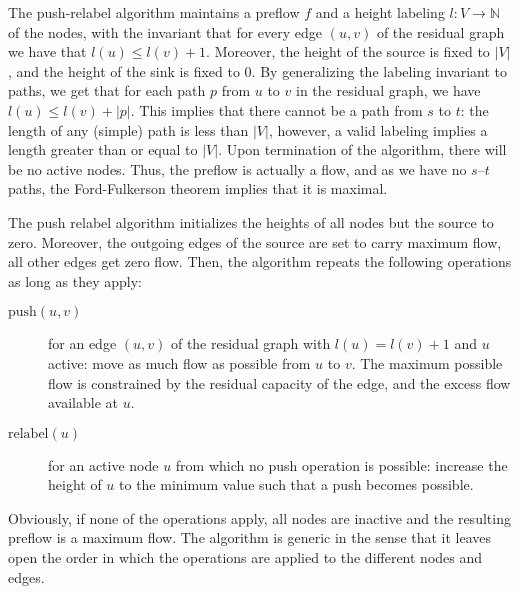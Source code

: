 \documentclass[smallcondensed]{svjour3}     %
\begin{document}
  The push-relabel algorithm maintains a preflow $f$ and a height labeling $l: V \to \mathbb {N}$ of the nodes, 
  with the invariant that for every edge $(u, v)$ of the residual graph we have that $l(u) \le l(v) + 1$. 
  Moreover, the height of the source is fixed to $\left\vert{V}\right\vert$, and the height of the sink is fixed to $0$.
  By generalizing the labeling invariant to paths, we get that for each path $p$ from $u$ to $v$ in the residual graph, we have $l(u) \le l(v) + |p|$.
  This implies that there cannot be a path from $s$ to $t$: the length of any (simple) path is less than $|V|$, however, a valid labeling 
  implies a length greater than or equal to $|V|$. Upon termination of the algorithm, there will be no active nodes. 
  Thus, the preflow is actually a flow, and as we have no $s$--$t$ paths, the Ford-Fulkerson theorem implies that it is maximal.
  
  The push relabel algorithm initializes the heights of all nodes but the source to zero. Moreover, the outgoing edges of the source are 
  set to carry maximum flow, all other edges get zero flow. Then, the algorithm repeats the following operations as long as they apply:
  \begin{description}
    \item[$\textrm{push}(u,v)$] for an edge $(u,v)$ of the residual graph with $l(u) = l(v)+1$ and $u$ active: move as much flow as possible from $u$ to $v$.
    The maximum possible flow is constrained by the residual capacity of the edge, and the excess flow available at $u$.
    \item[$\textrm{relabel}(u)$] for an active node $u$ from which no push operation is possible: increase the height of $u$ to the minimum value such that a push
      becomes possible.
  \end{description}
  Obviously, if none of the operations apply, all nodes are inactive and the resulting preflow is a maximum flow.
  The algorithm is generic in the sense that it leaves open the order in which the operations are applied to the different nodes and edges.
  
\end{document}

